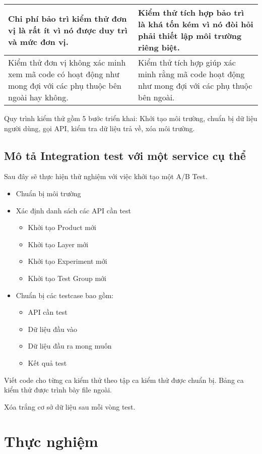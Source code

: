 \begin{table}[H]
\begin{tabular}{|p{8cm}|p{8cm}|}
		Chi phí bảo trì kiểm thử đơn vị là rất ít vì nó được duy trì và mức đơn vị.                                                                               & Kiểm thử tích hợp bảo trì là khá tốn kém vì nó đòi hỏi phải thiết lập môi trường riêng biệt.                                                 \\ \hline
		Kiểm thử đơn vị không xác minh xem mã code có hoạt động như mong đợi với các phụ thuộc bên ngoài hay không.                                               & Kiểm thử tích hợp giúp xác minh rằng mã code hoạt động như mong đợi với các phụ thuộc bên ngoài.                                             \\ \hline
	\end{tabular}
\end{table}

Quy trình kiểm thử gồm 5 bước triển khai: Khởi tạo môi trường, chuẩn bị dữ liệu người dùng, gọi API, kiểm tra dữ liệu trả về, xóa môi trường.

\subsection{Mô tả Integration test với một service cụ thể}

Sau đây sẽ thực hiện thử nghiệm với việc khởi tạo một A/B Test.

\begin{itemize}
	\item Chuẩn bị môi trường
	\item Xác định danh sách các API cần test
	      \begin{itemize}
		      \item Khởi tạo Product mới
		      \item Khởi tạo Layer mới
		      \item Khởi tạo Experiment mới
		      \item Khởi tạo Test Group mới
	      \end{itemize}
	\item Chuẩn bị các testcase bao gồm:
	      \begin{itemize}
		      \item API cần test
		      \item Dữ liệu đầu vào
		      \item Dữ liệu đầu ra mong muốn
		      \item Kết quả test
	      \end{itemize}
\end{itemize}

Viết code cho từng ca kiểm thử theo tập ca kiểm thử được chuẩn bị. Bảng ca kiểm thử được trình bày file ngoài.

Xóa trắng cơ sở dữ liệu sau mỗi vòng test.

\section{Thực nghiệm}
